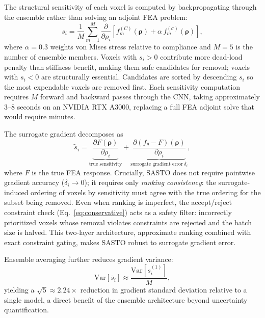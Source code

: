 \documentclass[11pt]{article}
\theoremstyle{plain}
\theoremstyle{definition}
\theoremstyle{remark}
\begin{document}
The structural sensitivity of each voxel is computed by backpropagating through the ensemble rather than solving an adjoint FEA problem:
\begin{equation}\label{eq:sensitivity}
s_i = \frac{1}{M}\sum_{m=1}^{M}\frac{\partial}{\partial\rho_i}\left[f_m^{(C)}(\boldsymbol{\rho}) + \alpha\,f_m^{(\sigma)}(\boldsymbol{\rho})\right],
\end{equation}
where $\alpha = 0.3$ weights von Mises stress relative to compliance and $M = 5$ is the number of ensemble members. Voxels with $s_i > 0$ contribute more dead-load penalty than stiffness benefit, making them safe candidates for removal; voxels with $s_i < 0$ are structurally essential. Candidates are sorted by descending $s_i$ so the most expendable voxels are removed first. Each sensitivity computation requires $M$ forward and backward passes through the CNN, taking approximately 3--8 seconds on an NVIDIA RTX A3000, replacing a full FEA adjoint solve that would require minutes.

The surrogate gradient decomposes as
\begin{equation}\label{eq:graddecomp}
\tilde{s}_i = \underbrace{\frac{\partial F(\boldsymbol{\rho})}{\partial\rho_i}}_{\text{true sensitivity}} + \underbrace{\frac{\partial(f_\theta - F)(\boldsymbol{\rho})}{\partial\rho_i}}_{\text{surrogate gradient error}~\delta_i},
\end{equation}
where $F$ is the true FEA response. Crucially, SASTO does not require pointwise gradient accuracy ($\delta_i \to 0$); it requires only \emph{ranking consistency}: the surrogate-induced ordering of voxels by sensitivity must agree with the true ordering for the subset being removed. Even when ranking is imperfect, the accept/reject constraint check (Eq.~\ref{eq:conservative}) acts as a safety filter: incorrectly prioritized voxels whose removal violates constraints are rejected and the batch size is halved. This two-layer architecture, approximate ranking combined with exact constraint gating, makes SASTO robust to surrogate gradient error.

Ensemble averaging further reduces gradient variance:
\begin{equation}\label{eq:variance}
\mathrm{Var}[\bar{s}_i] \approx \frac{\mathrm{Var}[s_i^{(1)}]}{M},
\end{equation}
yielding a $\sqrt{5} \approx 2.24\times$ reduction in gradient standard deviation relative to a single model, a direct benefit of the ensemble architecture beyond uncertainty quantification.
\end{document}

